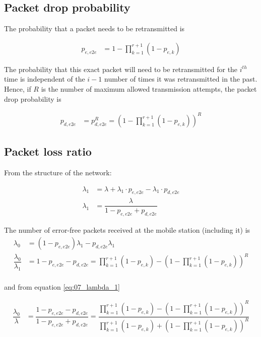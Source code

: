 \subsection{Packet drop probability}

The probability that a packet needs to be retransmitted is

\begin{align*}
  p_{e,e2e} &= 1 - \prod_{k=1}^{r+1} (1 - p_{e,k})
\end{align*}

The probability that this exact packet will need to be retransmitted for the
$i^{th}$ time is independent of the $i-1$ number of times it was retransmitted
in the past. Hence, if $R$ is the number of maximum allowed transmission
attempts, the packet drop probability is

\begin{align*}
  p_{d,e2e} &= p_{d,e2e}^R = (1 - \prod_{k=1}^{r+1} (1 - p_{e,k}))^R
\end{align*}


\subsection{Packet loss ratio}

From the structure of the network:

\begin{align}
  \lambda_1 &= \lambda + \lambda_1 \cdot p_{e,e2e} - \lambda_1 \cdot p_{d,e2e} \nonumber \\
  \lambda_1 &= \dfrac{\lambda}{1 - p_{e,e2e} + p_{d,e2e}} \label{eq:07_lambda_1}
\end{align}

The number of error-free packets received at the mobile station (including it)
is
\begin{align*}
  \lambda_0 &= (1 - p_{e,e2e}) \lambda_1 - p_{d,e2e} \lambda_1 \\
  \dfrac{\lambda_0}{\lambda_1} &= 1 - p_{e,e2e} - p_{d,e2e} =
  \prod_{k=1}^{r+1} (1 - p_{e,k}) - (1 - \prod_{k=1}^{r+1} (1 - p_{e,k}))^R\\
\end{align*}

and from equation \ref{eq:07_lambda_1}

\begin{align*}
  \dfrac{\lambda_0}{\lambda} &= \dfrac{1 - p_{e,e2e} - p_{d,e2e}}{1 - p_{e,e2e} + p_{d,e2e}} =
  \dfrac{\prod\limits_{k=1}^{r+1} (1 - p_{e,k}) - (1 - \prod\limits_{k=1}^{r+1} (1 - p_{e,k}))^R}
        {\prod\limits_{k=1}^{r+1} (1 - p_{e,k}) + (1 - \prod\limits_{k=1}^{r+1} (1 - p_{e,k}))^R}\\
\end{align*}


